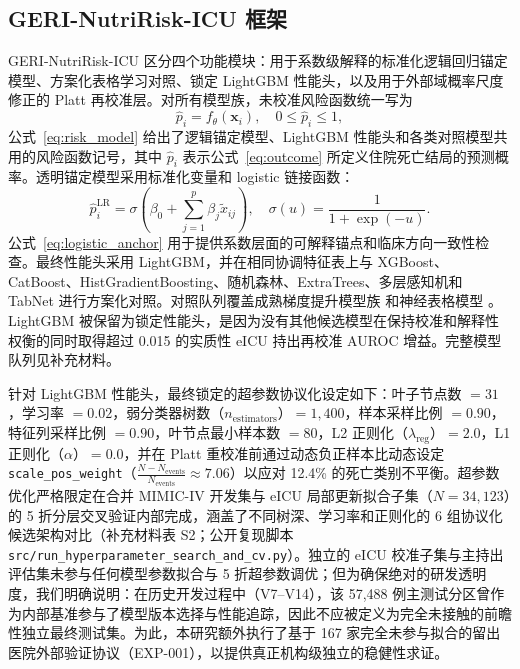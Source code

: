 \documentclass[11pt]{ctexart}
\begin{document}
\subsection{GERI-NutriRisk-ICU 框架}
GERI-NutriRisk-ICU 区分四个功能模块：用于系数级解释的标准化逻辑回归锚定模型、方案化表格学习对照、锁定 LightGBM 性能头，以及用于外部域概率尺度修正的 Platt 再校准层。对所有模型族，未校准风险函数统一写为
\begin{equation}
\hat{p}_i=f_{\theta}(\mathbf{x}_i),\quad 0\leq \hat{p}_i\leq 1,
\label{eq:risk_model}
\end{equation}
公式~\ref{eq:risk_model} 给出了逻辑锚定模型、LightGBM 性能头和各类对照模型共用的风险函数记号，其中 $\hat{p}_i$ 表示公式~\ref{eq:outcome} 所定义住院死亡结局的预测概率。透明锚定模型采用标准化变量和 logistic 链接函数：
\begin{equation}
\hat{p}^{\mathrm{LR}}_i=\sigma\left(\beta_0+\sum_{j=1}^{p}\beta_j\tilde{x}_{ij}\right),\quad
\sigma(u)=\frac{1}{1+\exp(-u)}.
\label{eq:logistic_anchor}
\end{equation}
公式~\ref{eq:logistic_anchor} 用于提供系数层面的可解释锚点和临床方向一致性检查。最终性能头采用 LightGBM，并在相同协调特征表上与 XGBoost、CatBoost、HistGradientBoosting、随机森林、ExtraTrees、多层感知机和 TabNet 进行方案化对照。对照队列覆盖成熟梯度提升模型族 \citep{Chen2016XGBoost,Ke2017LightGBM,Prokhorenkova2018CatBoost} 和神经表格模型 \citep{Arik2021TabNet}。LightGBM 被保留为锁定性能头，是因为没有其他候选模型在保持校准和解释性权衡的同时取得超过 0.015 的实质性 eICU 持出再校准 AUROC 增益。完整模型队列见补充材料。

针对 LightGBM 性能头，最终锁定的超参数协议化设定如下：叶子节点数 $= 31$，学习率 $= 0.02$，弱分类器树数（$n_{\mathrm{estimators}}$）$= 1{,}400$，样本采样比例 $= 0.90$，特征列采样比例 $= 0.90$，叶节点最小样本数 $= 80$，L2 正则化（$\lambda_{\mathrm{reg}}$）$= 2.0$，L1 正则化（$\alpha$）$= 0.0$，并在 Platt 重校准前通过动态负正样本比动态设定 \texttt{scale\_pos\_weight}（$\frac{N - N_{\mathrm{events}}}{N_{\mathrm{events}}} \approx 7.06$）以应对 12.4\% 的死亡类别不平衡。超参数优化严格限定在合并 MIMIC-IV 开发集与 eICU 局部更新拟合子集（$N=34{,}123$）的 5 折分层交叉验证内部完成，涵盖了不同树深、学习率和正则化的 6 组协议化候选架构对比（补充材料表 S2；公开复现脚本 \texttt{src/run\_hyperparameter\_search\_and\_cv.py}）。独立的 eICU 校准子集与主持出评估集未参与任何模型参数拟合与 5 折超参数调优；但为确保绝对的研发透明度，我们明确说明：在历史开发过程中（V7--V14），该 57,488 例主测试分区曾作为内部基准参与了模型版本选择与性能追踪，因此不应被定义为完全未接触的前瞻性独立最终测试集。为此，本研究额外执行了基于 167 家完全未参与拟合的留出医院外部验证协议（EXP-001），以提供真正机构级独立的稳健性求证。
\end{document}
